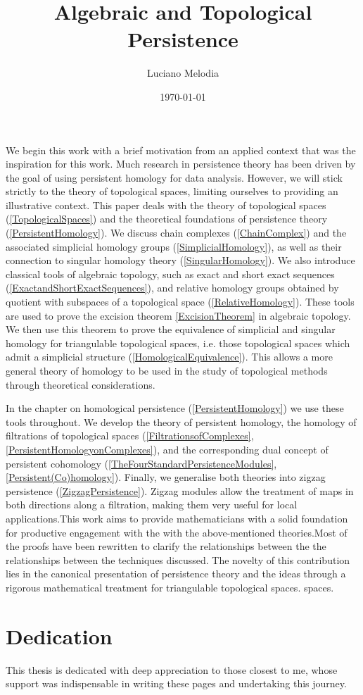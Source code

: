 \documentclass[b5paper, 12pt, twoside]{report}
\title{Algebraic and Topological Persistence}
\author{Luciano Melodia}
\date{\today}
\begin{document}


We begin this work with a brief motivation from an applied context that was the inspiration for this work.  Much research in persistence theory has been driven by the goal of using persistent homology for data analysis. However, we will stick strictly to the theory of topological spaces, limiting ourselves to providing an illustrative context. This paper deals with the theory of topological spaces (\ref{TopologicalSpaces}) and the theoretical foundations of persistence theory (\ref{PersistentHomology}). We discuss chain complexes (\ref{ChainComplex}) and the associated simplicial homology groups (\ref{SimplicialHomology}), as well as their connection to singular homology theory (\ref{SingularHomology}). We also introduce classical tools of algebraic topology, such as exact and short exact sequences (\ref{ExactandShortExactSequences}), and relative homology groups obtained by quotient with subspaces of a topological space (\ref{RelativeHomology}). These tools are used to prove the excision theorem \ref{ExcisionTheorem} in algebraic topology. We then use this theorem to prove the equivalence of simplicial and singular homology for triangulable topological spaces, i.e. those topological spaces which admit a simplicial structure (\ref{HomologicalEquivalence}). This allows a more general theory of homology to be used in the study of topological methods through theoretical considerations.

In the chapter on homological persistence (\ref{PersistentHomology}) we use these tools throughout. We develop the theory of persistent homology, the homology of filtrations of topological spaces (\ref{FiltrationsofComplexes}, \ref{PersistentHomologyonComplexes}), and the corresponding dual concept of persistent cohomology (\ref{TheFourStandardPersistenceModules}, \ref{Persistent(Co)homology}). Finally, we generalise both theories into zigzag persistence (\ref{ZigzagPersistence}). Zigzag modules allow the treatment of maps in both directions along a filtration, making them very useful for local applications.This work aims to provide mathematicians with a solid foundation for productive engagement with the with the above-mentioned theories.Most of the proofs have been rewritten to clarify the relationships between the the relationships between the techniques discussed. The novelty of this
contribution lies in the canonical presentation of persistence theory and the ideas through a rigorous mathematical treatment for triangulable topological spaces. spaces.

\chapter*{Dedication}
This thesis is dedicated with deep appreciation to those closest to me, whose
support was indispensable in writing these pages and undertaking this journey.
\end{document}
